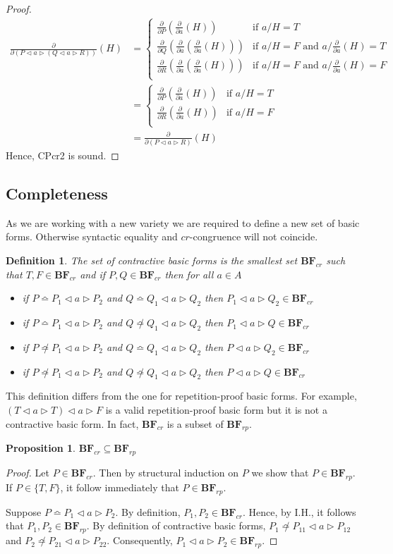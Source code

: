 \documentclass[a4paper,twoside,openright]{report}
\newcommand{\dd}[1]{\frac{\partial}{\partial #1}}
\newcommand{\BF}{\ensuremath{\textbf{BF}}}
\newcommand{\syn}{\bumpeq}
\newcommand{\nsyn}{\not\bumpeq}
\newcommand{\lef}{\ensuremath{\triangleleft}}
\newcommand{\rig}{\ensuremath{\triangleright}}
\newtheorem{prop}[theorem]{Proposition}
\newtheorem{defn}[theorem]{Definition}
\begin{document}
\begin{proof}
\begin{align*}
\dd{(P\lef a\rig(Q\lef a\rig R))}(H)
&=\begin{cases}
\dd P(\dd a(H)) & \text{if $a/H=T$}\\
\dd Q(\dd a(\dd a(H))) & \text{if $a/H=F$ and $a/\dd a(H)=T$}\\
\dd R(\dd a(\dd a(H))) & \text{if $a/H=F$ and $a/\dd a(H)=F$}\\
\end{cases}\\
&=\begin{cases}
\dd P(\dd a(H)) & \text{if $a/H=T$}\\
\dd R(\dd a(H)) & \text{if $a/H=F$}\\
\end{cases}\\
&=\dd{(P\lef a\rig R)}(H)
\end{align*}
Hence, CPcr2 is sound.
\end{proof}

\subsection{Completeness}
As we are working with a new variety we are required to define a new set of basic forms. Otherwise syntactic equality and $cr$-congruence will not coincide.
\begin{defn}
The set of contractive basic forms is the smallest set $\BF_{cr}$ such that $T,F\in\BF_{cr}$ and if $P,Q\in\BF_{cr}$ then for all $a\in A$
\begin{itemize}
\item if $P\syn P_1\lef a\rig P_2$ and $Q\syn Q_1\lef a\rig Q_2$ then $P_1\lef a\rig Q_2\in\BF_{cr}$
\item if $P\syn P_1\lef a\rig P_2$ and $Q\nsyn Q_1\lef a\rig Q_2$ then $P_1\lef a\rig Q\in\BF_{cr}$
\item if $P\nsyn P_1\lef a\rig P_2$ and $Q\syn Q_1\lef a\rig Q_2$ then $P\lef a\rig Q_2\in\BF_{cr}$
\item if $P\nsyn P_1\lef a\rig P_2$ and $Q\nsyn Q_1\lef a\rig Q_2$ then $P\lef a\rig Q\in\BF_{cr}$
\end{itemize}
\end{defn}
This definition differs from the one for repetition-proof basic forms. For example, $(T\lef a\rig T)\lef a\rig F$ is a valid repetition-proof basic form but it is not a contractive basic form. In fact, $\BF_{cr}$ is a subset of $\BF_{rp}$.
\begin{prop}
$\BF_{cr}\subseteq\BF_{rp}$
\end{prop}
\begin{proof}
Let $P\in\BF_{cr}$. Then by structural induction on $P$ we show that $P\in\BF_{rp}$. If $P\in\{T,F\}$, it follow immediately that $P\in\BF_{rp}$.

Suppose $P\syn P_1\lef a\rig P_2$. By definition, $P_1,P_2\in\BF_{cr}$. Hence, by I.H., it follows that $P_1,P_2\in\BF_{rp}$. By definition of contractive basic forms, $P_1\nsyn P_{11}\lef a\rig P_{12}$ and $P_2\nsyn P_{21}\lef a \rig P_{22}$. Consequently, $P_1\lef a\rig P_2\in\BF_{rp}$.
\end{proof}
\end{document}
